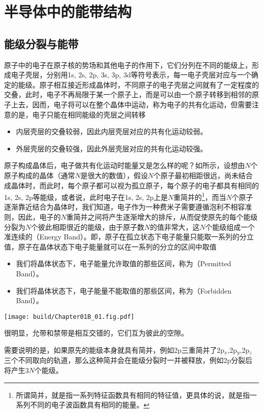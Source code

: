 \section{半导体中的能带结构}

\subsection{能级分裂与能带}
原子中的电子在原子核的势场和其他电子的作用下，它们分列在不同的能级上，形成电子壳层，分别用1s, 2s, 2p, 3s, 3p, 3d等符号表示，每一电子壳层对应与一个确定的能级。原子相互接近形成晶体时，不同原子的电子壳层之间就有了一定程度的交叠，此时，电子不再局限于某一个原子上，而是可以由一个原子转移到相邻的原子上去，因而，电子将可以在整个晶体中运动，称为电子的共有化运动，但需要注意的是，电子只能在相同能级的壳层之间转移
\begin{itemize}
    \item 内层壳层的交叠较弱，因此内层壳层对应的共有化运动较弱。
    \item 外层壳层的交叠较强，因此外层壳层对应的共有化运动较强。
\end{itemize}
原子构成晶体后，电子做共有化运动时能量又是怎么样的呢？如所示，设想由$N$个原子构成的晶体（通常$N$是很大的数值），假设$N$个原子最初相距很远，尚未结合成晶体时，而此时，每个原子都可以视为孤立原子，每个原子的电子都具有相同的1s, 2s, 2p等能级，或者说，此时电子在1s, 2s, 2p上是$N$重简并的\footnote{所谓简并，就是指一系列特征函数具有相同的特征值，更具体的说，就是指一系列不同的电子波函数具有相同的能量。}，而当$N$个原子逐渐靠近结合为晶体时，我们知道，电子作为一种费米子需要遵循泡利不相容准则，因此，电子的$N$重简并之间将产生逐渐增大的排斥，从而促使原先的每个能级分裂为$N$个彼此相距很近的能级，由于原子数$N$的值非常大，这$N$个能级组成一个准连续的（Energy Band）。即，原子在孤立状态下电子能量只能取一系列的分立值，原子在晶体状态下电子能量就可以在一系列的分立的区间中取值
\begin{itemize}
    \item 我们将晶体状态下，电子能量允许取值的那些区间，称为（Permitted Band）。
    \item 我们将晶体状态下，电子能量不能取值的那些区间，称为（Forbidden Band）。
\end{itemize}
\begin{Figure}[能级分裂与能带]
    \texttt{[image: build/Chapter01B\_01.fig.pdf]}
\end{Figure}
很明显，允带和禁带是相互交错的，它们互为彼此的空隙。

需要说明的是，如果原先的能级本身就具有简并，例如2p三重简并了2p$_x$,2p$_y$,2p$_z$三个不同取向的轨道，那么这种简并会在能级分裂时一并被释放，例如2p分裂后将产生$3N$个能级。

